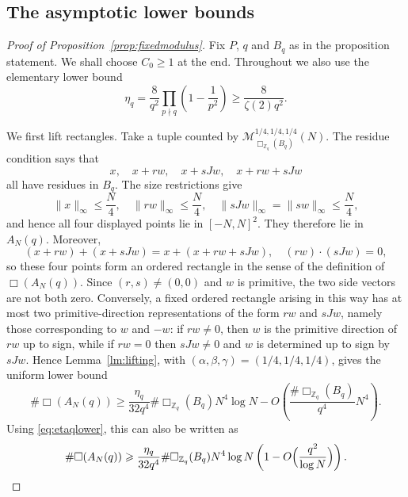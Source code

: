 \documentclass[11pt,reqno]{amsart}
\numberwithin{equation}{section}
\newcommand{\norm}[1]{\lVert #1\rVert_\infty}
\renewcommand{\le}{\leqslant}
\renewcommand{\ge}{\geqslant}
\begin{document}
\subsection{The asymptotic lower bounds}
\begin{proof}[Proof of Proposition~\ref{prop:fixedmodulus}]
Fix $P$, $q$ and $B_q$ as in the proposition statement. 
We shall choose $C_0\ge1$ at the end. Throughout we also use the elementary lower bound
\begin{equation}\label{eq:etaqlower}
\eta_q=\frac8{q^2}\prod_{p\nmid q}\left(1-\frac1{p^2}\right) \ge \frac{8}{\zeta(2)q^2}.
\end{equation}

We first lift rectangles. Take a tuple counted by
$\mathcal{M}_{\Box_{\mathbb{Z}_q}(B_q)}^{1/4,1/4,1/4}(N)$. The residue condition says that
\[ x, \quad x+rw, \quad x+sJw, \quad x+rw+sJw \]
all have residues in $B_q$. The size restrictions give
\[ \norm{x}\le \frac{N}{4}, \quad \norm{rw}\le \frac{N}{4}, \quad \norm{sJw}=\norm{sw}\le \frac{N}{4}, \]
and hence all four displayed points lie in $[-N,N]^2$. They therefore lie in $A_N(q)$. Moreover,
\[ (x+rw)+(x+sJw)=x+(x+rw+sJw), \quad (rw)\cdot(sJw)=0, \]
so these four points form an ordered rectangle in the sense of the definition of $\Box(A_N(q))$. Since $(r,s)\ne(0,0)$ and $w$ is primitive, the two side vectors are not both zero. Conversely, a fixed ordered rectangle arising in this way has at most two primitive-direction representations of the form $rw$ and $sJw$, namely those corresponding to $w$ and $-w$: if $rw\ne0$, then $w$ is the primitive direction of $rw$ up to sign, while if $rw=0$ then $sJw\ne0$ and $w$ is determined up to sign by $sJw$. Hence Lemma~\ref{lm:lifting}, with $(\alpha,\beta,\gamma)=(1/4,1/4,1/4)$, gives the uniform lower bound
\[ \#\Box(A_N(q)) \ge \frac{\eta_q}{32q^4}\#\Box_{\mathbb{Z}_q}(B_q)N^4\log N - O\left(\frac{\#\Box_{\mathbb{Z}_q}(B_q)}{q^4}N^4\right). \]
Using \eqref{eq:etaqlower}, this can also be written as
\begin{equation}\label{eq:rectrelative}
\#\Box(A_N(q)) \ge \frac{\eta_q}{32q^4}\#\Box_{\mathbb{Z}_q}(B_q)N^4\log N \left(1-O\Bigl(\frac{q^2}{\log N}\Bigr)\right).
\end{equation}


\end{proof}
\end{document}

